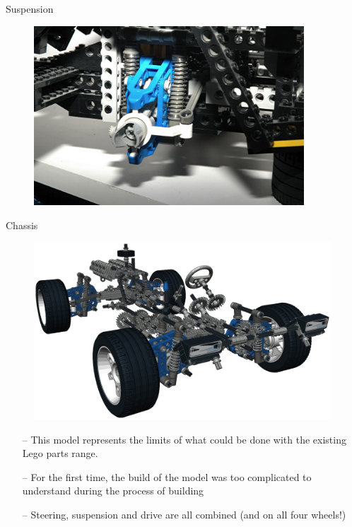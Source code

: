 \documentclass[xcolor=dvipsnames]{beamer}
\begin{document}
\begin{frame}[fragile]{Suspension}
\begin{figure}[H]
 \centering
 \includegraphics[width=0.9\textwidth]{1994_8880_car_suspension.jpg}
\end{figure}
\end{frame}

\begin{frame}[fragile]{Chassis}
\begin{figure}[H]
 \centering
 \includegraphics[width=0.99\textwidth]{1994_8880_car_chassis.jpg}
\end{figure}
\end{frame}

\begin{frame}[fragile]{}
\begin{itemize}
\item[--] This model represents the limits of what could be done with the existing Lego parts range.  \vspace{3mm}
\item[--] For the first time, the build of the model was too complicated to understand during the process of building \vspace{3mm}
\item[--] Steering, suspension and drive are all combined (and on all four wheels!) \vspace{3mm}
\end{itemize}
\end{frame}
\end{document}
